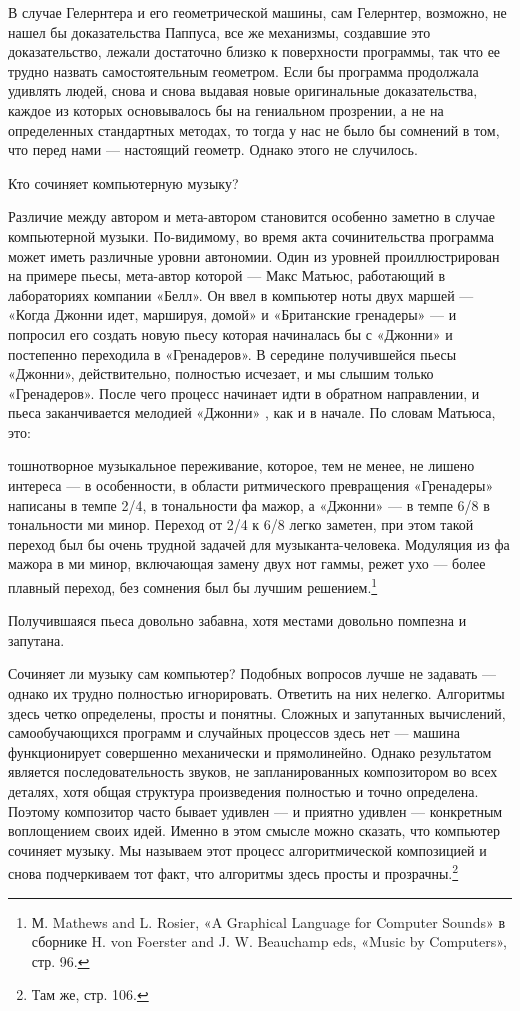 \documentclass[../main.tex]{subfiles}
\begin{document}
В случае Гелернтера и его геометрической машины, сам Гелернтер, возможно, не нашел бы доказательства Паппуса, все же механизмы, создавшие это доказательство, лежали достаточно близко к поверхности программы, так что ее трудно назвать самостоятельным геометром. Если бы программа продолжала удивлять людей, снова и снова выдавая новые оригинальные доказательства, каждое из которых основывалось бы на гениальном прозрении, а не на определенных стандартных методах, то тогда у нас не было бы сомнений в том, что перед нами --- настоящий геометр. Однако этого не случилось.

Кто сочиняет компьютерную музыку?

Различие между автором и мета-автором становится особенно заметно в случае компьютерной музыки. По-видимому, во время акта сочинительства программа может иметь различные уровни автономии. Один из уровней проиллюстрирован на примере пьесы, мета-автор которой --- Макс Матьюс, работающий в лабораториях компании «Белл». Он ввел в компьютер ноты двух маршей --- «Когда Джонни идет, маршируя, домой» и «Британские гренадеры» --- и попросил его создать новую пьесу которая начиналась бы с «Джонни» и постепенно переходила в «Гренадеров». В середине получившейся пьесы «Джонни», действительно, полностью исчезает, и мы слышим только «Гренадеров». После чего процесс начинает идти в обратном направлении, и пьеса заканчивается мелодией «Джонни» , как и в начале. По словам Матьюса, это:

тошнотворное музыкальное переживание, которое, тем не менее, не лишено интереса --- в особенности, в области ритмического превращения «Гренадеры» написаны в темпе 2/4, в тональности фа мажор, а «Джонни» --- в темпе 6/8 в тональности ми минор. Переход от 2/4 к 6/8 легко заметен, при этом такой переход был бы очень трудной задачей для музыканта-человека. Модуляция из фа мажора в ми минор, включающая замену двух нот гаммы, режет ухо --- более плавный переход, без сомнения был бы лучшим решением.\footnote{М. Mathews and L. Rosier, «A Graphical Language for Computer Sounds» в сборнике H. von Foerster and J. W. Beauchamp eds, «Music by Computers», стр. 96.}

Получившаяся пьеса довольно забавна, хотя местами довольно помпезна и запутана.

Сочиняет ли музыку сам компьютер? Подобных вопросов лучше не задавать --- однако их трудно полностью игнорировать. Ответить на них нелегко. Алгоритмы здесь четко определены, просты и понятны. Сложных и запутанных вычислений, самообучающихся программ и случайных процессов здесь нет --- машина функционирует совершенно механически и прямолинейно. Однако результатом является последовательность звуков, не запланированных композитором во всех деталях, хотя общая структура произведения полностью и точно определена. Поэтому композитор часто бывает удивлен --- и приятно удивлен --- конкретным воплощением своих идей. Именно в этом смысле можно сказать, что компьютер сочиняет музыку. Мы называем этот процесс алгоритмической композицией и снова подчеркиваем тот факт, что алгоритмы здесь просты и прозрачны.\footnote{Там же, стр. 106.}
\end{document}
